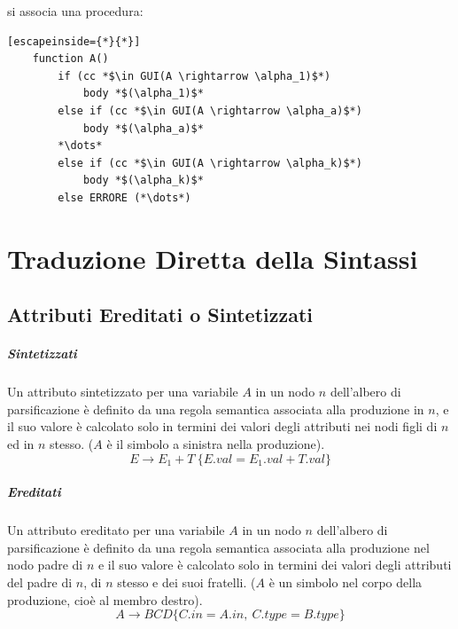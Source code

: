 \documentclass[12pt]{article}
\begin{document}
si associa una procedura:
\begin{lstlisting}[escapeinside={*}{*}]
    function A()
        if (cc *$\in GUI(A \rightarrow \alpha_1)$*)
            body *$(\alpha_1)$*
        else if (cc *$\in GUI(A \rightarrow \alpha_a)$*)
            body *$(\alpha_a)$*
        *\dots*
        else if (cc *$\in GUI(A \rightarrow \alpha_k)$*)
            body *$(\alpha_k)$*
        else ERRORE (*\dots*)
\end{lstlisting}

\section{Traduzione Diretta della Sintassi}
\subsection{Attributi Ereditati o Sintetizzati}
\subparagraph*{Sintetizzati}
Un attributo sintetizzato per una variabile $A$ in un nodo $n$ dell’albero di parsificazione 
è definito da una regola semantica associata alla produzione in $n$, e il suo valore è calcolato
solo in termini dei valori degli attributi nei nodi figli di $n$ ed in $n$ stesso. ($A$ è il simbolo a sinistra nella produzione).
\begin{equation*}
    E \rightarrow E_1 + T\  \{E.val = E_1.val + T.val\}
\end{equation*}
\subparagraph*{Ereditati}
Un attributo ereditato per una variabile $A$ in un nodo $n$ dell’albero di parsificazione è definito
da una regola semantica associata alla produzione nel nodo padre di $n$ e il suo valore è calcolato
solo in termini dei valori degli attributi del padre di $n$, di $n$ stesso e dei suoi fratelli. 
($A$ è un simbolo nel corpo della produzione, cioè al membro  destro).
\begin{equation*}
    A \rightarrow BCD \{ C.in = A.in,\ C.type = B.type \} 
\end{equation*}
\end{document}
